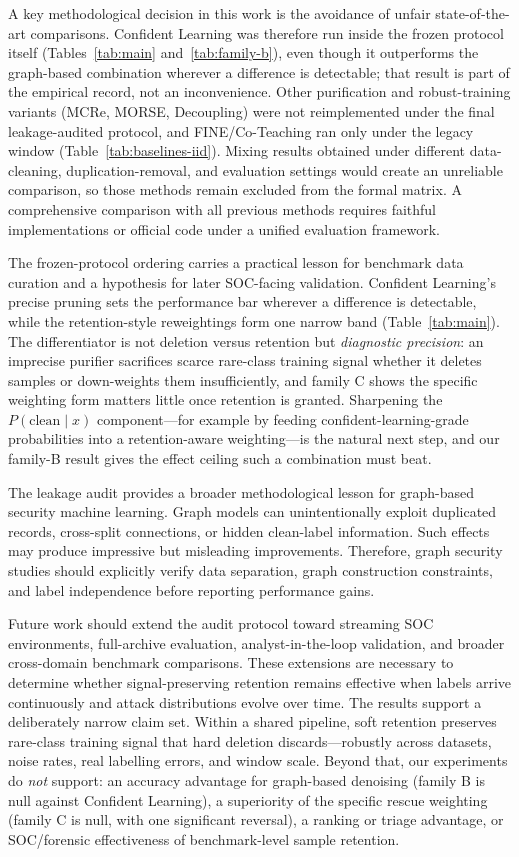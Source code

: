 \documentclass[pdflatex,referee,lineno,sn-basic,Numbered]{sn-jnl}
\begin{document}
A key methodological decision in this work is the avoidance of unfair
state-of-the-art comparisons. Confident Learning was therefore run inside the
frozen protocol itself (Tables~\ref{tab:main} and~\ref{tab:family-b}), even
though it outperforms the graph-based combination wherever a difference is
detectable; that result is part of the empirical record, not an inconvenience.
Other purification and robust-training
variants (MCRe, MORSE, Decoupling) were not
reimplemented under the final leakage-audited protocol, and FINE/Co-Teaching ran
only under the legacy window (Table~\ref{tab:baselines-iid}). Mixing results obtained
under different data-cleaning, duplication-removal, and evaluation settings
would create an unreliable comparison, so those methods remain excluded from
the formal matrix. A comprehensive comparison with all previous methods
requires faithful implementations or official code under a unified evaluation
framework.

The frozen-protocol ordering carries a practical lesson for benchmark data
curation and a hypothesis for later SOC-facing validation. Confident Learning's
precise pruning sets the performance bar wherever a difference is detectable,
while the retention-style reweightings form one narrow band
(Table~\ref{tab:main}). The differentiator is not deletion versus retention but
\emph{diagnostic precision}: an imprecise purifier sacrifices scarce rare-class
training signal whether it deletes samples or down-weights them insufficiently,
and family C shows the specific weighting form matters little once retention is
granted. Sharpening the $P(\text{clean}\mid x)$ component---for example by
feeding confident-learning-grade probabilities into a retention-aware
weighting---is the natural next step, and our family-B result gives the effect
ceiling such a combination must beat.

The leakage audit provides a broader methodological lesson for graph-based
security machine learning. Graph models can unintentionally exploit duplicated
records, cross-split connections, or hidden clean-label information. Such
effects may produce impressive but misleading improvements. Therefore, graph
security studies should explicitly verify data separation, graph construction
constraints, and label independence before reporting performance gains.

Future work should extend the audit protocol toward streaming SOC environments,
full-archive evaluation, analyst-in-the-loop validation, and broader
cross-domain benchmark comparisons. These extensions are necessary to determine
whether signal-preserving retention remains effective when labels arrive
continuously and attack distributions evolve over time.
The results support a deliberately narrow claim set. Within a shared pipeline,
soft retention preserves rare-class training signal that hard deletion
discards---robustly across datasets, noise rates, real labelling errors, and
window scale. Beyond that, our experiments do \emph{not} support: an accuracy
advantage for graph-based denoising (family B is null against Confident
Learning), a superiority of the specific rescue weighting (family C is null,
with one significant reversal), a ranking or triage advantage, or SOC/forensic
effectiveness of benchmark-level sample retention.
\end{document}
